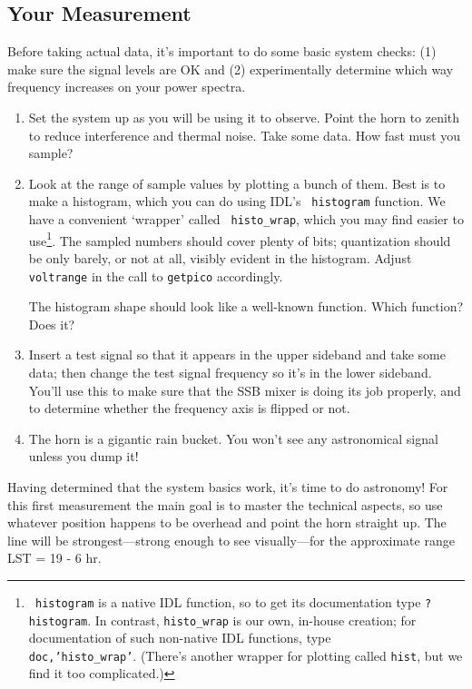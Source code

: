 \documentclass[12pt,preprint]{aastex}
\begin{document}
\subsection{Your Measurement}

Before taking actual data, it's important to do some basic system
checks: (1) make sure the signal levels are OK and (2) experimentally
determine which way frequency increases on your power spectra.
\begin{enumerate}

\item Set the system up as you will be using it to observe. Point the
  horn to zenith to reduce interference and thermal noise.  Take some
data.  How fast must you sample? 

\item Look at the range of sample values by plotting a bunch of
  them. Best is to make a histogram, which you can do using IDL's {\tt
    histogram} function.  We have a convenient `wrapper' called {\tt
    histo\_wrap}, which you may find easier to use\footnote{{\tt
      histogram} is a native IDL function, so to get its documentation
    type {\tt ?histogram}. In contrast, {\tt histo\_wrap} is our own,
    in-house creation; for documentation of such non-native IDL
    functions, type \\ {\tt doc,'histo\_wrap'}. (There's another wrapper
    for plotting called {\tt hist}, but we find it too
    complicated.)}. The sampled numbers should cover plenty of bits;
  quantization should be only barely, or not at all, visibly evident in
  the histogram. Adjust {\tt voltrange} in the call to {\tt getpico}
  accordingly.

The
  histogram shape should look like a well-known function. Which
  function? Does it?

\item Insert a test signal so that it appears in the upper sideband and
take some data; then change the test signal frequency so it's in the
lower sideband.  You'll use this to make sure that the SSB mixer is
doing its job properly, and to determine whether the frequency axis
is flipped or not.

\item The horn is a gigantic rain bucket. You won't see any
  astronomical signal unless you dump it!

\end{enumerate}

Having determined that the system basics work, it's time to do
astronomy! For this first measurement the main goal is to master the
technical aspects, so use whatever position happens to be overhead and
point the horn straight up. The line will be strongest---strong enough
to see visually---for the approximate range LST = 19 - 6 hr.
\end{document}
